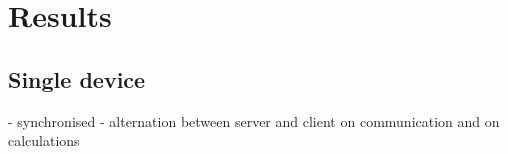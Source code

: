 \documentclass[../thesis.tex]{subfiles}
\begin{document}
\section{Results}
\subsection{Single device}
- synchronised
- alternation between server and client on communication and on calculations

     
     
     
\end{document}
